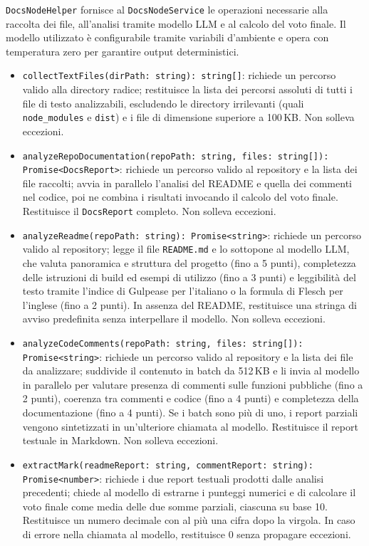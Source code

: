 \documentclass[a4paper, 11pt]{article}
\newcounter{subsubsubsection}[subsubsection]
\begin{document}
\texttt{DocsNodeHelper} fornisce al \texttt{DocsNodeService} le operazioni necessarie alla
raccolta dei file, all'analisi tramite modello LLM e al calcolo del voto finale. Il modello
utilizzato è configurabile tramite variabili d'ambiente e opera con temperatura zero per
garantire output deterministici.
\begin{itemize}
  \item \texttt{collectTextFiles(dirPath: string): string[]}:
  richiede un percorso valido alla directory radice; restituisce la lista dei percorsi
  assoluti di tutti i file di testo analizzabili, escludendo le directory irrilevanti
  (quali \texttt{node\_modules} e \texttt{dist}) e i file di dimensione superiore a 100\,KB.
  Non solleva eccezioni.
 
  \item \texttt{analyzeRepoDocumentation(repoPath: string, files: string[]): Promise<DocsReport>}:
  richiede un percorso valido al repository e la lista dei file raccolti; avvia in parallelo
  l'analisi del README e quella dei commenti nel codice, poi ne combina i risultati invocando
  il calcolo del voto finale. Restituisce il \texttt{DocsReport} completo. Non solleva eccezioni.
 
  \item \texttt{analyzeReadme(repoPath: string): Promise<string>}:
  richiede un percorso valido al repository; legge il file \texttt{README.md} e lo sottopone
  al modello LLM, che valuta panoramica e struttura del progetto (fino a 5 punti), completezza
  delle istruzioni di build ed esempi di utilizzo (fino a 3 punti) e leggibilità del testo
  tramite l'indice di Gulpease per l'italiano o la formula di Flesch per l'inglese (fino a
  2 punti). In assenza del README, restituisce una stringa di avviso predefinita senza
  interpellare il modello. Non solleva eccezioni.
 
  \item \texttt{analyzeCodeComments(repoPath: string, files: string[]): Promise<string>}:
  richiede un percorso valido al repository e la lista dei file da analizzare; suddivide il
  contenuto in batch da 512\,KB e li invia al modello in parallelo per valutare presenza
  di commenti sulle funzioni pubbliche (fino a 2 punti), coerenza tra commenti e codice
  (fino a 4 punti) e completezza della documentazione (fino a 4 punti). Se i batch sono
  più di uno, i report parziali vengono sintetizzati in un'ulteriore chiamata al modello.
  Restituisce il report testuale in Markdown. Non solleva eccezioni.
 
  \item \texttt{extractMark(readmeReport: string, commentReport: string): Promise<number>}:
  richiede i due report testuali prodotti dalle analisi precedenti; chiede al modello di
  estrarne i punteggi numerici e di calcolare il voto finale come media delle due somme
  parziali, ciascuna su base 10. Restituisce un numero decimale con al più una cifra dopo
  la virgola. In caso di errore nella chiamata al modello, restituisce 0 senza propagare
  eccezioni.
\end{itemize}
 
\end{document}
